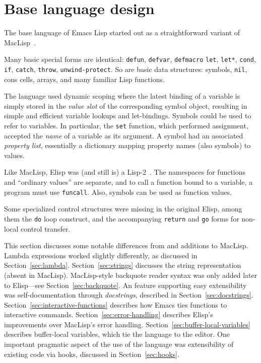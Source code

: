 \documentclass[format=acmsmall, review=false, screen=true]{acmart}
\newcommand \Elisp {Elisp}
\begin{document}
\section{Base language design}
\label{sec:base-language-design}

The base language of Emacs Lisp started out as a straightforward
variant of MacLisp~\cite{Moon1974,Pitman1983}.

Many basic special forms are identical: \texttt{defun},
\texttt{defvar}, \texttt{defmacro} \texttt{let}, \texttt{let*},
\texttt{cond}, \texttt{if}, \texttt{catch}, \texttt{throw},
\texttt{unwind-protect}.  So are basic data structures: symbols,
\texttt{nil}, cons cells, arrays, and many familiar Lisp
functions.

The language used dynamic scoping where the latest binding of a variable is
simply stored in the \emph{value slot} of the corresponding symbol object,
resulting in simple and efficient variable lookups and let-bindings.
Symbols could be used to refer to variables.  In particular, the
\texttt{set} function, which performed assignment, accepted the
\emph{name} of a variable as its argument.  A symbol had an associated
\emph{property list}, essentially a dictionary mapping property
names (also symbols) to values.

Like MacLisp, \Elisp{} was (and still is) a
Lisp-2~\cite{SteeleGabriel1993}.  The namespaces for functions and
``ordinary values'' are separate, and to call a function bound to a
variable, a program must use \texttt{funcall}.  Also, symbols can be
used as function values.

Some specialized control structures were missing in the original
\Elisp{}, among them the \texttt{do} loop construct, and the
accompanying \texttt{return} and \texttt{go} forms for non-local
control transfer.

This section discusses some notable differences from and additions to
MacLisp.  Lambda expressions worked slightly differently, as discussed
in Section~\ref{sec:lambda}.  Section~\ref{sec:strings} discusses the
string representation (absent in MacLisp).
MacLisp-style backquote reader syntax was only added later to \Elisp{}---see Section~\ref{sec:backquote}.
An feature supporting easy extensibility was self-documentation
through \textit{docstrings}, described in
Section~\ref{sec:docstrings}.
Section~\ref{sec:interactive-functions} describes how Emacs ties
functions to interactive commands.
Section~\ref{sec:error-handling} describes \Elisp{}'s improvements
over MacLisp's error handling.
Section~\ref{sec:buffer-local-variables} describes buffer-local
variables, which tie the language to the editor.  One important
pragmatic aspect of the use of the language was extensibility of
existing code via hooks, discussed in Section~\ref{sec:hooks}.
\end{document}
